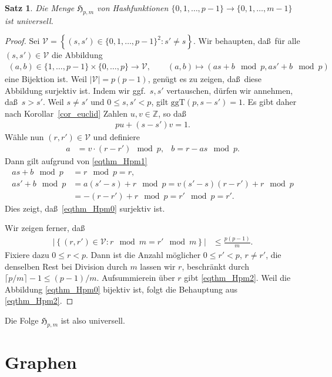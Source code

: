 \documentclass[10pt,reqno]{amsart}
\numberwithin{equation}{section}
\newcommand\ggt{\ggT}
\newcommand\ggT{\mathrm{ggT}}
\newcommand\cV{\mathcal V}
\newcommand\fH{\mathfrak H}
\newcommand\ZZ{\mathbb Z}
\newtheorem{theorem}[definition]{Satz}
\newcommand\cbc[1]{\left\{{#1}\right\}}
\newcommand\abs[1]{\left|{#1}\right|}
\newcommand\Cor{Korollar}
\begin{document}
\begin{theorem}\label{thm_Hpm}
	Die Menge $\fH_{p,m}$ von Hashfunktionen $\{0,1,\ldots,p-1\}\to\{0,1,\ldots,m-1\}$ ist universell.
\end{theorem}
\begin{proof}
	Sei $\cV=\cbc{(s,s')\in\{0,1,\ldots,p-1\}^2:s'\neq s}$.
	Wir behaupten, da\ss\ f\"ur alle $(s,s')\in\cV$ die Abbildung
	\begin{align}\label{eqthm_Hpm0}
		(a,b)\in\{1,\ldots,p-1\}\times\{0,\ldots,p\}\to\cV,\qquad(a,b)\mapsto(as+b\mod p,as'+b\mod p)
	\end{align}
eine Bijektion ist.
Weil $|\cV|=p(p-1)$, gen\"ugt es zu zeigen, da\ss\ diese Abbildung surjektiv ist.
Indem wir ggf.\ $s,s'$ vertauschen, d\"urfen wir annehmen, da\ss\ $s>s'$.
Weil $s\neq s'$ und $0\leq s,s'<p$, gilt $\ggt(p,s-s')=1$.
Es gibt daher nach \Cor~\ref{cor_euclid} Zahlen $u,v\in\ZZ$, so da\ss
	\begin{align}\label{eqthm_Hpm1}
		pu+(s-s')v=1.
	\end{align}
W\"ahle nun $(r,r')\in\cV$ und definiere
\begin{align*}
	a&=v\cdot(r-r')\mod p,&b=r-as\mod p.
\end{align*}
Dann gilt aufgrund von \eqref{eqthm_Hpm1}
\begin{align*}
	as+b\mod p&=r\mod p=r,\\
	as'+b\mod p&=a(s'-s)+r\mod p=v(s'-s)(r-r')+r\mod p\\
			   &=-(r-r')+r\mod p=r'\mod p=r'.
\end{align*}
Dies zeigt, da\ss\ \eqref{eqthm_Hpm0} surjektiv ist.

Wir zeigen ferner, da\ss\
\begin{align}\label{eqthm_Hpm2}
	\abs{\cbc{(r,r')\in\cV:r\mod m=r'\mod m}}&\leq\frac{p(p-1)}m.
\end{align}
Fixiere dazu $0\leq r<p$.
Dann ist die Anzahl m\"oglicher $0\leq r'<p$, $r\neq r'$, die denselben Rest bei Division durch $m$ lassen wir $r$, beschr\"ankt durch $\lceil p/m\rceil-1\leq(p-1)/m$.
Aufsummierein \"uber $r$ gibt \eqref{eqthm_Hpm2}.
Weil die Abbildung \eqref{eqthm_Hpm0} bijektiv ist, folgt die Behauptung aus \eqref{eqthm_Hpm2}.
\end{proof}

Die Folge $\fH_{p,m}$ ist also universell.

\section{Graphen}
\end{document}
